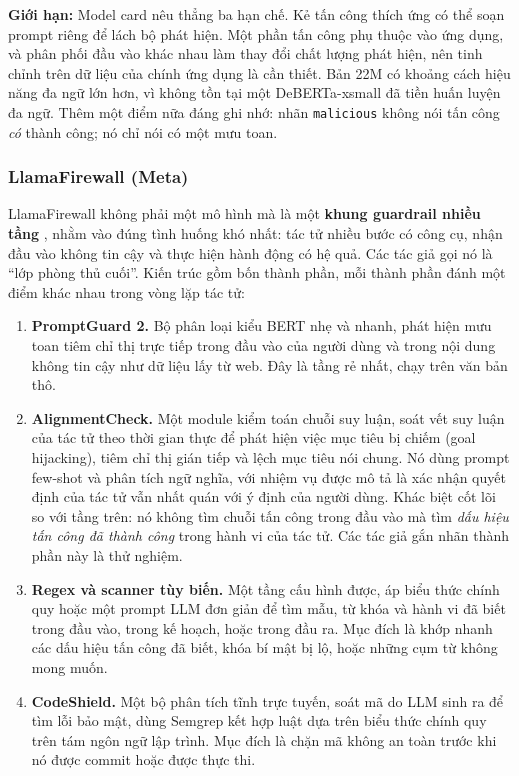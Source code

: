 \textbf{Giới hạn:} Model card nêu thẳng ba hạn chế. Kẻ tấn công thích ứng có thể soạn prompt riêng để lách bộ phát hiện. Một phần tấn công phụ thuộc vào ứng dụng, và phân phối đầu vào khác nhau làm thay đổi chất lượng phát hiện, nên tinh chỉnh trên dữ liệu của chính ứng dụng là cần thiết. Bản 22M có khoảng cách hiệu năng đa ngữ lớn hơn, vì không tồn tại một DeBERTa-xsmall đã tiền huấn luyện đa ngữ. Thêm một điểm nữa đáng ghi nhớ: nhãn \texttt{malicious} không nói tấn công \emph{có} thành công; nó chỉ nói có một mưu toan.

\subsubsection{LlamaFirewall (Meta)}

LlamaFirewall không phải một mô hình mà là một \textbf{khung guardrail nhiều tầng} \cite{chennabasappa2025llamafirewall}, nhằm vào đúng tình huống khó nhất: tác tử nhiều bước có công cụ, nhận đầu vào không tin cậy và thực hiện hành động có hệ quả. Các tác giả gọi nó là ``lớp phòng thủ cuối''. Kiến trúc gồm bốn thành phần, mỗi thành phần đánh một điểm khác nhau trong vòng lặp tác tử:

\begin{enumerate}
	\item \textbf{PromptGuard 2.} Bộ phân loại kiểu BERT nhẹ và nhanh, phát hiện mưu toan tiêm chỉ thị trực tiếp trong đầu vào của người dùng và trong nội dung không tin cậy như dữ liệu lấy từ web. Đây là tầng rẻ nhất, chạy trên văn bản thô.
	\item \textbf{AlignmentCheck.} Một module kiểm toán chuỗi suy luận, soát vết suy luận của tác tử theo thời gian thực để phát hiện việc mục tiêu bị chiếm (goal hijacking), tiêm chỉ thị gián tiếp và lệch mục tiêu nói chung. Nó dùng prompt few-shot và phân tích ngữ nghĩa, với nhiệm vụ được mô tả là xác nhận quyết định của tác tử vẫn nhất quán với ý định của người dùng. Khác biệt cốt lõi so với tầng trên: nó không tìm chuỗi tấn công trong đầu vào mà tìm \emph{dấu hiệu tấn công đã thành công} trong hành vi của tác tử. Các tác giả gắn nhãn thành phần này là thử nghiệm.
	\item \textbf{Regex và scanner tùy biến.} Một tầng cấu hình được, áp biểu thức chính quy hoặc một prompt LLM đơn giản để tìm mẫu, từ khóa và hành vi đã biết trong đầu vào, trong kế hoạch, hoặc trong đầu ra. Mục đích là khớp nhanh các dấu hiệu tấn công đã biết, khóa bí mật bị lộ, hoặc những cụm từ không mong muốn.
	\item \textbf{CodeShield.} Một bộ phân tích tĩnh trực tuyến, soát mã do LLM sinh ra để tìm lỗi bảo mật, dùng Semgrep kết hợp luật dựa trên biểu thức chính quy trên tám ngôn ngữ lập trình. Mục đích là chặn mã không an toàn trước khi nó được commit hoặc được thực thi.
\end{enumerate}

